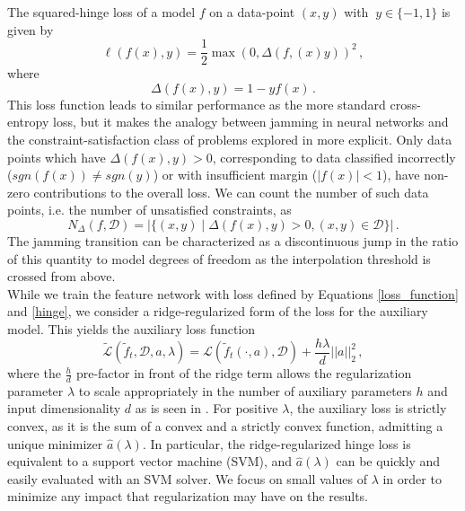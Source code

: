 \documentclass[11pt]{article}
\begin{document}
The squared-hinge loss of a model $f$ on a data-point $(x,y)$ with  $\ y\in \{-1,1\}$ is given by
\begin{equation}
    \ell(f(x), y) = \frac{1}{2}\max(0, \Delta(f,(x) y))^2\,,
    \label{hinge}
\end{equation}
where
\begin{equation}
    \Delta(f(x), y) = 1 - yf(x)\,.
\end{equation}
This loss function leads to similar performance as the more standard cross-entropy loss, but it makes the analogy between jamming in neural networks and the constraint-satisfaction class of problems explored in \cite{krzakalaLandscapeAnalysisConstraint2007} more explicit. Only data points which have $\Delta(f(x), y) > 0$, corresponding to data classified incorrectly ($ sgn(f(x)) \neq sgn(y)$) or with insufficient margin ($|f(x)| < 1$), have non-zero contributions to the overall loss. We can count the number of such data points, i.e. the number of unsatisfied constraints, as 
\begin{equation}
    N_\Delta(f, \mathcal D) = \left|\{(x, y) \mid \Delta(f(x), y) > 0, (x,y) \in \mathcal D\}\right|\,.
\end{equation}
The jamming transition can be characterized as a discontinuous jump in the ratio of this quantity to model degrees of freedom as the interpolation threshold is crossed from above. \\

While we train the feature network with loss defined by Equations \eqref{loss_function} and \eqref{hinge}, we consider a ridge-regularized form of the loss for the auxiliary model. This yields the auxiliary loss function
\begin{equation}
    \tilde{\mathcal{L}} (\tilde f_t, \mathcal D, a, \lambda) = \mathcal L (\tilde f_t(\cdot, a), \mathcal D) + \frac{h \lambda}{d} ||a||_2^2\,,
    \label{loss_reg}
\end{equation}
where the $\frac{h}{d}$ pre-factor in front of the ridge term allows the regularization parameter $\lambda$ to scale appropriately in the number of auxiliary parameters $h$ and input dimensionality $d$ as is seen in \cite{meiGeneralizationErrorRandom2019}. For positive $\lambda$, the auxiliary loss is strictly convex, as it is the sum of a convex and a strictly convex function, admitting a unique minimizer $\hat a(\lambda)$. In particular, the ridge-regularized hinge loss is equivalent to a support vector machine (SVM), and $\hat a(\lambda)$ can be quickly and easily evaluated with an SVM solver. We focus on small values of $\lambda$ in order to minimize any impact that regularization may have on the results.
\end{document}
